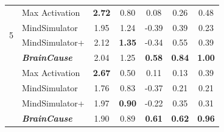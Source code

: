 \begin{table}[ht]
\begin{tabular}{@{}clccccc@{}}
\multirow{4}{*}{5}
& Max Activation
& \textbf{2.72} & 0.80 & 0.08 & 0.26 & 0.48 \\
& MindSimulator
& 1.95 & 1.24 & -0.39 & 0.39 & 0.23 \\
& MindSimulator+
& 2.12 & \textbf{1.35} & -0.34 & 0.55 & 0.39 \\
& \emph{\textbf{BrainCause}}
& 2.04 & 1.25 & \textbf{0.58} & \textbf{0.84} & \textbf{1.00} \\

\addlinespace[2pt]
\midrule

\multirow{4}{*}{7}
& Max Activation
& \textbf{2.67} & 0.50 & 0.11 & 0.13 & 0.39 \\
& MindSimulator
& 1.76 & 0.83 & -0.37 & 0.21 & 0.21 \\
& MindSimulator+
& 1.97 & \textbf{0.90} & -0.22 & 0.35 & 0.31 \\
& \emph{\textbf{BrainCause}}
& 1.90 & 0.89 & \textbf{0.61} & \textbf{0.62} & \textbf{0.96} \\

\bottomrule
\end{tabular}
\label{tab:scores_top50_across_subjects_region100}
\end{table}